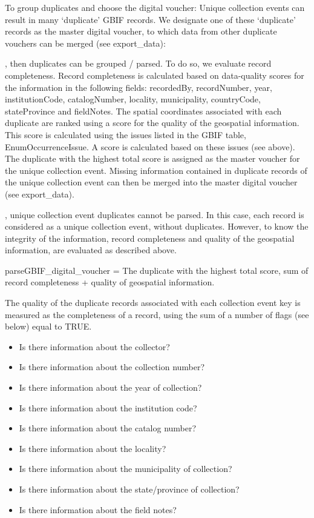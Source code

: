 \documentclass[a4paper]{book}
\begin{document}
\begin{Description}
To group duplicates and choose the digital voucher:
Unique collection events can result in many ‘duplicate’ GBIF records. We designate one of these ‘duplicate’ records
as the master digital voucher, to which data from other duplicate vouchers can be merged (see export\_data):

, then duplicates can be grouped / parsed.
To do so, we evaluate record completeness. Record completeness is calculated based on data-quality scores
for the information in the following  fields: recordedBy, recordNumber, year, institutionCode, catalogNumber, locality, municipality,
countryCode, stateProvince and fieldNotes. The spatial coordinates associated with each duplicate are ranked using a score for the
quality of the geospatial information. This score is calculated using the issues listed in the GBIF table, EnumOccurrenceIssue.
A score is calculated based on these issues (see above). The duplicate with the highest total score is assigned as the master voucher
for the unique collection event. Missing information contained in duplicate records of the unique collection event can then be merged
into the master digital voucher (see export\_data).

, unique collection event duplicates cannot be parsed. In this case,
each record is considered as a unique collection event, without duplicates. However, to know the integrity
of the information, record completeness and quality of the geospatial information, are evaluated as described above.

parseGBIF\_digital\_voucher = The duplicate with the highest total score, sum of record completeness + quality of geospatial information.

The quality of the duplicate records associated with each collection event key is measured as the
completeness of a record, using the sum of a number of flags (see below) equal to TRUE.

\begin{itemize}

\item{} Is there information about the collector?
\item{} Is there information about the collection number?
\item{} Is there information about the year of collection?
\item{} Is there information about the institution code?
\item{} Is there information about the catalog number?
\item{} Is there information about the locality?
\item{} Is there information about the municipality of collection?
\item{} Is there information about the state/province of collection?
\item{} Is there information about the field notes?


\end{itemize}
\end{Description}
\end{document}
